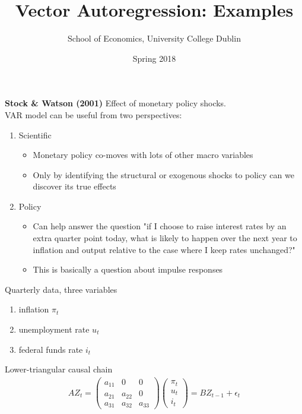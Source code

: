 \documentclass{beamer}
\title{Vector Autoregression: Examples}
\author{School of Economics, University College Dublin}
\date{Spring 2018}
\begin{document}
\begin{frame}
 \titlepage
\end{frame}

\begin{frame}
  \textbf{Stock \& Watson (2001)} Effect of monetary policy shocks. \\
   VAR model can be useful from two perspectives: 
   \medskip
  \begin{enumerate}
    \item Scientific
    \begin{itemize}
      \item Monetary policy co-moves with lots of other macro variables
      \item Only by identifying the structural or exogenous shocks to policy can we discover its true effects
    \end{itemize}
    \medskip
    \item Policy
    \begin{itemize}
      \item Can help answer the question "if I choose to raise interest rates by an extra quarter point today, what is likely to
happen over the next year to inflation and output relative to the case
where I keep rates unchanged?"
    \item This is basically a question about impulse responses
    \end{itemize}
  \end{enumerate}
\end{frame}

\begin{frame}
  Quarterly data, three variables
\begin{enumerate}
  \item inflation $\pi_t$
  \item unemployment rate $u_t$
  \item federal funds rate $i_t$
\end{enumerate}
\medskip
Lower-triangular causal chain 
\begin{align}
  AZ_t = \begin{pmatrix}
    a_{11} & 0 & 0 \\
    a_{21} & a_{22} & 0\\
    a_{31} & a_{32} & a_{33}
  \end{pmatrix}
  \begin{pmatrix}
    \pi_t \\ u_t \\ i_t
  \end{pmatrix}
  = BZ_{t-1} + \epsilon_t
\end{align}
\end{frame}
\end{document}
